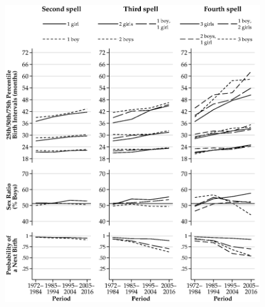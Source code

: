 \documentclass[12pt,letterpaper]{article}
\begin{document}
\begin{figure}
\centering
\includegraphics[width=\textwidth,height=\textheight,keepaspectratio=true]{bs_med_rural}
\end{figure}
\end{document}
